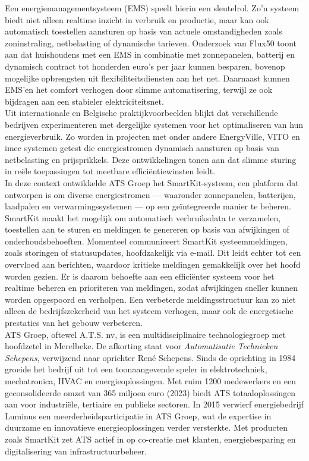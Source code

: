 Een energiemanagementsysteem (EMS) speelt hierin een sleutelrol. Zo’n systeem biedt niet alleen realtime inzicht in verbruik en productie, maar kan ook automatisch toestellen aansturen op basis van actuele omstandigheden zoals zoninstraling, netbelasting of dynamische tarieven. Onderzoek van Flux50 toont aan dat huishoudens met een EMS in combinatie met zonnepanelen, batterij en dynamisch contract tot honderden euro’s per jaar kunnen besparen, bovenop mogelijke opbrengsten uit flexibiliteitsdiensten aan het net. Daarnaast kunnen EMS'en het comfort verhogen door slimme automatisering, terwijl ze ook bijdragen aan een stabieler elektriciteitsnet.\\

Uit internationale en Belgische praktijkvoorbeelden blijkt dat verschillende bedrijven experimenteren met dergelijke systemen voor het optimaliseren van hun energieverbruik. Zo worden in projecten met onder andere EnergyVille, VITO en imec systemen getest die energiestromen dynamisch aansturen op basis van netbelasting en prijsprikkels. Deze ontwikkelingen tonen aan dat slimme sturing in reële toepassingen tot meetbare efficiëntiewinsten leidt.\\

In deze context ontwikkelde ATS Groep het SmartKit-systeem, een platform dat ontworpen is om diverse energiestromen — waaronder zonnepanelen, batterijen, laadpalen en verwarmingssystemen — op een geïntegreerde manier te beheren. SmartKit maakt het mogelijk om automatisch verbruiksdata te verzamelen, toestellen aan te sturen en meldingen te genereren op basis van afwijkingen of onderhoudsbehoeften. Momenteel communiceert SmartKit systeemmeldingen, zoals storingen of statusupdates, hoofdzakelijk via e-mail. Dit leidt echter tot een overvloed aan berichten, waardoor kritieke meldingen gemakkelijk over het hoofd worden gezien. Er is daarom behoefte aan een efficiënter systeem voor het realtime beheren en prioriteren van meldingen, zodat afwijkingen sneller kunnen worden opgespoord en verholpen. Een verbeterde meldingsstructuur kan zo niet alleen de bedrijfszekerheid van het systeem verhogen, maar ook de energetische prestaties van het gebouw verbeteren.\\

ATS Groep, oftewel A.T.S. nv, is een multidisciplinaire technologiegroep met hoofdzetel in Merelbeke. De afkorting staat voor \textit{Automatisatie Technieken Schepens}, verwijzend naar oprichter René Schepens. Sinds de oprichting in 1984 groeide het bedrijf uit tot een toonaangevende speler in elektrotechniek, mechatronica, HVAC en energieoplossingen. Met ruim 1200 medewerkers en een geconsolideerde omzet van 365 miljoen euro (2023) biedt ATS totaaloplossingen aan voor industriële, tertiaire en publieke sectoren. In 2015 verwierf energiebedrijf Luminus een meerderheidsparticipatie in ATS Groep, wat de expertise in duurzame en innovatieve energieoplossingen verder versterkte. Met producten zoals SmartKit zet ATS actief in op co-creatie met klanten, energiebesparing en digitalisering van infrastructuurbeheer.



